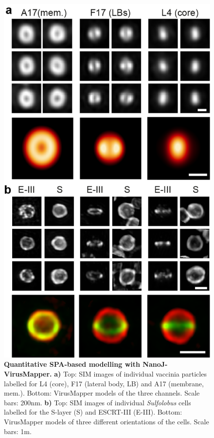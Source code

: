 \begin{figure}[!t]
    \centering
    \includegraphics[width=\linewidth]{Figures/NanoJ_VirusMapperFigure_rot.png}
    \caption{\textbf{Quantitative SPA-based modelling with NanoJ-VirusMapper.} \textbf{a)} Top: SIM images of individual vaccinia particles labelled for L4 (core), F17 (lateral body, LB) and A17 (membrane, mem.). Bottom: VirusMapper models of the three channels. Scale bars: 200nm. \textbf{b)} Top: SIM images of individual \emph{Sulfolobus} cells labelled for the S-layer (S) and ESCRT-III (E-III). Bottom: VirusMapper models of three different orientations of the cells. Scale bars: 1\micro m. }
    \label{fig:VirusMapper}
\end{figure}


